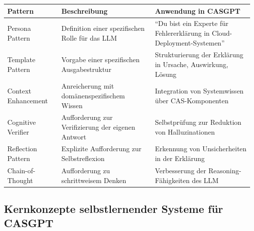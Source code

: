 \documentclass[
  a4paper,
  12pt,
  oneside,
  open=any,
  BCOR=12mm,
  DIV=14,
  parskip=half*,
  headsepline,
  footsepline,
  pointlessnumbers,
  liststotoc,
  numbers=noenddot,
  listof=totoc]{scrartcl}
\begin{document}
\begin{longtable}[]{@{}
  >{\raggedright\arraybackslash}p{}
  >{\raggedright\arraybackslash}p{}
  >{\raggedright\arraybackslash}p{}@{}}
\toprule\noalign{}
\begin{minipage}[b]{\linewidth}\raggedright
\textbf{Pattern}
\end{minipage} & \begin{minipage}[b]{\linewidth}\raggedright
\textbf{Beschreibung}
\end{minipage} & \begin{minipage}[b]{\linewidth}\raggedright
\textbf{Anwendung in CASGPT}
\end{minipage} \\
\midrule\noalign{}
\endhead
\bottomrule\noalign{}
\endlastfoot
Persona Pattern & Definition einer spezifischen Rolle für das LLM & ``Du
bist ein Experte für Fehlererklärung in Cloud-Deployment-Systemen'' \\
Template Pattern & Vorgabe einer spezifischen Ausgabestruktur &
Strukturierung der Erklärung in Ursache, Auswirkung, Lösung \\
Context Enhancement & Anreicherung mit domänenspezifischem Wissen &
Integration von Systemwissen über CAS-Komponenten \\
Cognitive Verifier & Aufforderung zur Verifizierung der eigenen Antwort
& Selbstprüfung zur Reduktion von Halluzinationen \\
Reflection Pattern & Explizite Aufforderung zur Selbstreflexion &
Erkennung von Unsicherheiten in der Erklärung \\
Chain-of-Thought & Aufforderung zu schrittweisem Denken & Verbesserung
der Reasoning-Fähigkeiten des LLM \\
\end{longtable}

\newpage

\subsection{Kernkonzepte selbstlernender Systeme für
CASGPT}\label{kernkonzepte-selbstlernender-systeme-fuxfcr-casgpt}
\end{document}
